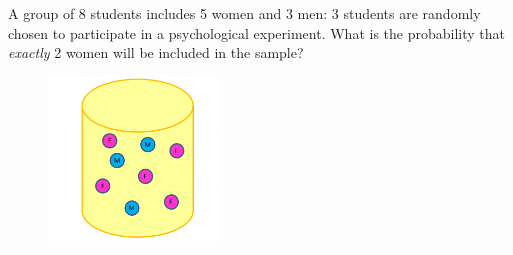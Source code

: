 \documentclass[smaller]{beamer}\usepackage[]{graphicx}\usepackage[]{color}
\begin{document}
\begin{frame}{\secname}

  \begin{example}
  A group of 8 students includes 5 women and 3 men: 3 students are randomly chosen to participate in a psychological
  experiment. What is the probability that \emph{exactly} 2 women will be included
  in the sample?%
  \begin{figure}[ptb]\centering
  \includegraphics[width=0.4\textwidth]{img/URNpic_2.pdf}
  \end{figure}
  \end{example}
\end{frame}%
\end{document}
